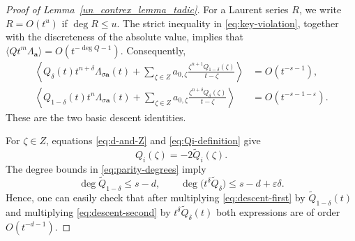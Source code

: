 \documentclass[11pt]{article}
\theoremstyle{remark}
\begin{document}
\begin{proof}[Proof of Lemma~\ref{un_contrex_lemma_tadic}]

For a Laurent series $R$, we write $R=O(t^u)$ if $\deg R\leq u$. The
strict inequality in \eqref{eq:key-violation}, together with the
discreteness of the absolute value, implies that $\langle
Qt^m\Lambda_{\mathbf a}\rangle =O(t^{-\deg Q-1})$. Consequently,
\begin{align}
 \left\langle
 Q_\delta(t)t^{n+\delta}\Lambda_{\sigma\mathbf a}(t)
 +
 \sum_{\zeta\in Z}
 a_{0,\zeta}
 \frac{\zeta^{n+1}Q_{1-\delta}(\zeta)}
      {t-\zeta}
 \right\rangle
 &=O(t^{-s-1}),
 \label{eq:descent-first}
 \\
 \left\langle
 Q_{1-\delta}(t)t^n\Lambda_{\sigma\mathbf a}(t)
 +
 \sum_{\zeta\in Z}
 a_{0,\zeta}
 \frac{\zeta^{n+\delta}Q_\delta(\zeta)}
      {t-\zeta}
 \right\rangle
 &=O(t^{-s-1-\varepsilon}).
 \label{eq:descent-second}
\end{align}
These are the two basic descent identities.

For $\zeta\in Z$, equations \eqref{eq:d-and-Z} and
\eqref{eq:Qi-definition} give
\begin{equation} \label{eq:Qi-at-zeta}
 Q_i(\zeta)=-2\widetilde Q_i(\zeta).
\end{equation}
The degree bounds in \eqref{eq:parity-degrees} imply
\[
 \deg\widetilde Q_{1-\delta}\leq s-d,
 \qquad
 \deg\bigl(t^\delta\widetilde Q_\delta\bigr)
 \leq s-d+\varepsilon\delta.
\]
Hence, one can easily check that after multiplying
\eqref{eq:descent-first} by $\widetilde Q_{1-\delta}(t)$
and multiplying \eqref{eq:descent-second} by $t^\delta\widetilde
Q_\delta(t)$ both expressions are of order $O(t^{-d-1})$.


\end{proof}
\end{document}
